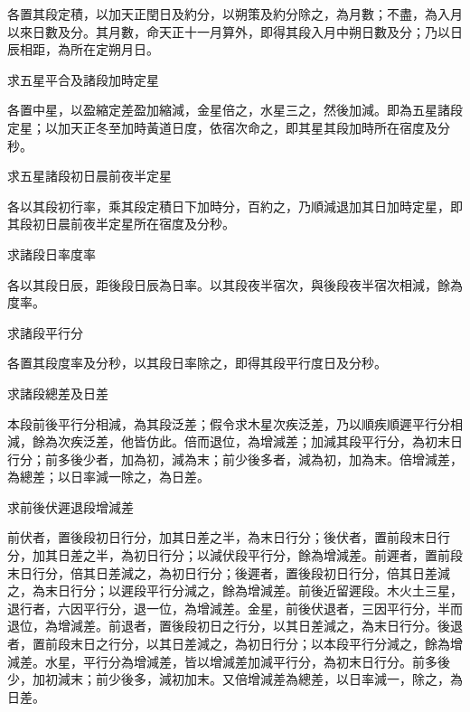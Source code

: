 \begin{pinyinscope}
 各置其段定積，以加天正閏日及約分，以朔策及約分除之，為月數；不盡，為入月以來日數及分。其月數，命天正十一月算外，即得其段入月中朔日數及分；乃以日辰相距，為所在定朔月日。



 求五星平合及諸段加時定星



 各置中星，以盈縮定差盈加縮減，金星倍之，水星三之，然後加減。即為五星諸段定星；以加天正冬至加時黃道日度，依宿次命之，即其星其段加時所在宿度及分秒。



 求五星諸段初日晨前夜半定星



 各以其段初行率，乘其段定積日下加時分，百約之，乃順減退加其日加時定星，即其段初日晨前夜半定星所在宿度及分秒。



 求諸段日率度率



 各以其段日辰，距後段日辰為日率。以其段夜半宿次，與後段夜半宿次相減，餘為度率。



 求諸段平行分



 各置其段度率及分秒，以其段日率除之，即得其段平行度日及分秒。



 求諸段總差及日差



 本段前後平行分相減，為其段泛差；假令求木星次疾泛差，乃以順疾順遲平行分相減，餘為次疾泛差，他皆仿此。倍而退位，為增減差；加減其段平行分，為初末日行分；前多後少者，加為初，減為末；前少後多者，減為初，加為末。倍增減差，為總差；以日率減一除之，為日差。



 求前後伏遲退段增減差



 前伏者，置後段初日行分，加其日差之半，為末日行分；後伏者，置前段末日行分，加其日差之半，為初日行分；以減伏段平行分，餘為增減差。前遲者，置前段末日行分，倍其日差減之，為初日行分；後遲者，置後段初日行分，倍其日差減之，為末日行分；以遲段平行分減之，餘為增減差。前後近留遲段。木火土三星，退行者，六因平行分，退一位，為增減差。金星，前後伏退者，三因平行分，半而退位，為增減差。前退者，置後段初日之行分，以其日差減之，為末日行分。後退者，置前段末日之行分，以其日差減之，為初日行分；以本段平行分減之，餘為增減差。水星，平行分為增減差，皆以增減差加減平行分，為初末日行分。前多後少，加初減末；前少後多，減初加末。又倍增減差為總差，以日率減一，除之，為日差。




\end{pinyinscope}
